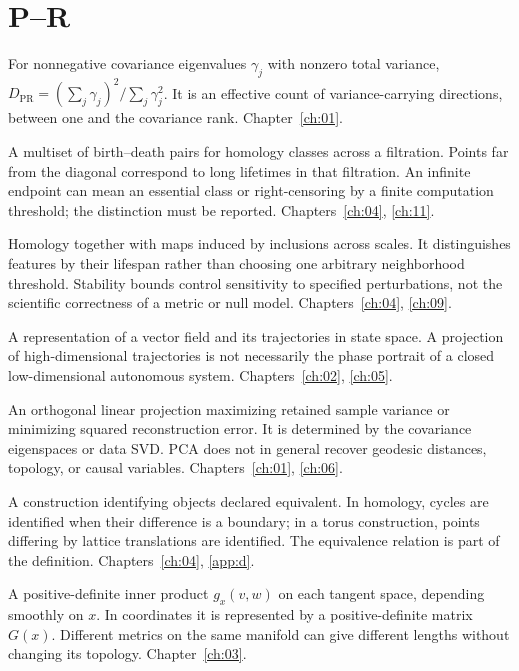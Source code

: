 \section*{P--R}
\begin{description}[style=nextline]
\item[Participation ratio.] For nonnegative covariance eigenvalues $\gamma_j$ with nonzero total variance, $D_{\mathrm{PR}}=(\sum_j\gamma_j)^2/\sum_j\gamma_j^2$. It is an effective count of variance-carrying directions, between one and the covariance rank. Chapter~\ref{ch:01}.
\item[Persistence diagram.] A multiset of birth--death pairs for homology classes across a filtration. Points far from the diagonal correspond to long lifetimes in that filtration. An infinite endpoint can mean an essential class or right-censoring by a finite computation threshold; the distinction must be reported. Chapters~\ref{ch:04}, \ref{ch:11}.
\item[Persistent homology.] Homology together with maps induced by inclusions across scales. It distinguishes features by their lifespan rather than choosing one arbitrary neighborhood threshold. Stability bounds control sensitivity to specified perturbations, not the scientific correctness of a metric or null model. Chapters~\ref{ch:04}, \ref{ch:09}.
\item[Phase portrait.] A representation of a vector field and its trajectories in state space. A projection of high-dimensional trajectories is not necessarily the phase portrait of a closed low-dimensional autonomous system. Chapters~\ref{ch:02}, \ref{ch:05}.
\item[Principal component analysis (PCA).] An orthogonal linear projection maximizing retained sample variance or minimizing squared reconstruction error. It is determined by the covariance eigenspaces or data SVD. PCA does not in general recover geodesic distances, topology, or causal variables. Chapters~\ref{ch:01}, \ref{ch:06}.
\item[Quotient.] A construction identifying objects declared equivalent. In homology, cycles are identified when their difference is a boundary; in a torus construction, points differing by lattice translations are identified. The equivalence relation is part of the definition. Chapters~\ref{ch:04}, \ref{app:d}.
\item[Riemannian metric.] A positive-definite inner product $g_x(v,w)$ on each tangent space, depending smoothly on $x$. In coordinates it is represented by a positive-definite matrix $G(x)$. Different metrics on the same manifold can give different lengths without changing its topology. Chapter~\ref{ch:03}.
\end{description}

